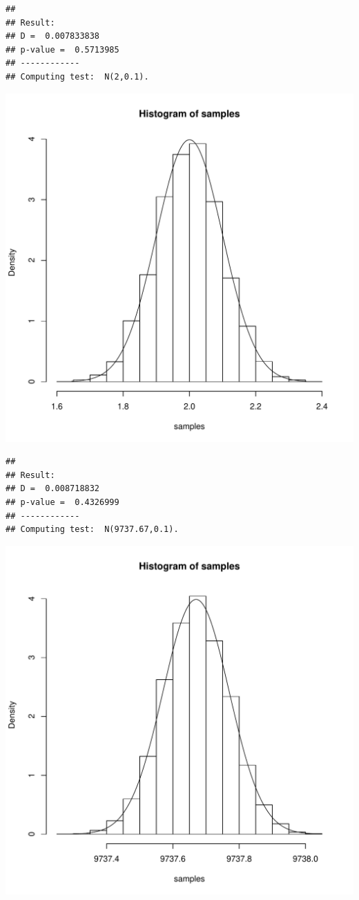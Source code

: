 \documentclass{llncs}\usepackage[]{graphicx}\usepackage[]{color}
\makeatletter
\def\maxwidth{ %
  \ifdim\Gin@nat@width>\linewidth
    \linewidth
  \else
    \Gin@nat@width
  \fi
}
\newenvironment{kframe}{%
 \def\at@end@of@kframe{}%
 \ifinner\ifhmode%
  \def\at@end@of@kframe{\end{minipage}}%
  \begin{minipage}{\columnwidth}%
 \fi\fi%
 \def\FrameCommand##1{\hskip\@totalleftmargin \hskip-\fboxsep
 \colorbox{shadecolor}{##1}\hskip-\fboxsep
     \hskip-\linewidth \hskip-\@totalleftmargin \hskip\columnwidth}%
 \MakeFramed {\advance\hsize-\width
   \@totalleftmargin\z@ \linewidth\hsize
   \@setminipage}}%
 {\par\unskip\endMakeFramed%
 \at@end@of@kframe}
\newenvironment{knitrout}{}{} %
\makeatother
\begin{document}
\begin{knitrout}
\begin{kframe}\begin{lstlisting}[basicstyle=\ttfamily,breaklines=true]
## 
## Result:
## D =  0.007833838 
## p-value =  0.5713985 
## ------------
## Computing test:  N(2,0.1).
\end{lstlisting}
\end{kframe}
\includegraphics[width=\maxwidth]{figure/Rt-19} 
\begin{kframe}\begin{lstlisting}[basicstyle=\ttfamily,breaklines=true]
## 
## Result:
## D =  0.008718832 
## p-value =  0.4326999 
## ------------
## Computing test:  N(9737.67,0.1).
\end{lstlisting}
\end{kframe}
\includegraphics[width=\maxwidth]{figure/Rt-20} 

\end{knitrout}
\end{document}

